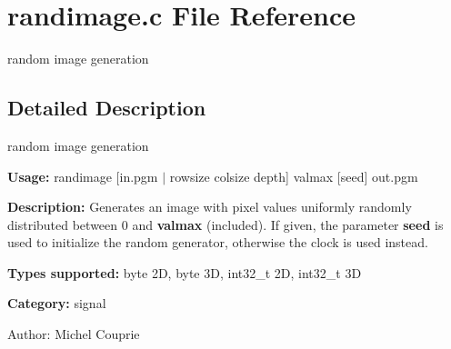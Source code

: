 \section{randimage.c File Reference}
\label{randimage_8c}
random image generation  




\label{_details}
\subsection{Detailed Description}
random image generation 

{\bf Usage:} randimage [in.pgm $|$ rowsize colsize depth] valmax [seed] out.pgm

{\bf Description:} Generates an image with pixel values uniformly randomly distributed between 0 and {\bf valmax} (included). If given, the parameter {\bf seed} is used to initialize the random generator, otherwise the clock is used instead.

{\bf Types supported:} byte 2D, byte 3D, int32\_\-t 2D, int32\_\-t 3D

{\bf Category:} signal

\begin{Desc}
\item[Author:]Michel Couprie \end{Desc}
